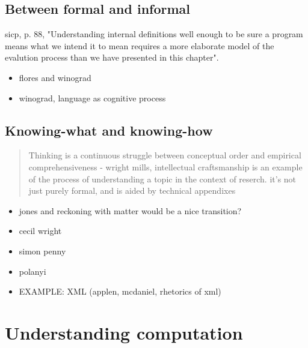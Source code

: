 \subsection{Between formal and informal} %




sicp,  p. 88, "Understanding internal definitions well enough to be sure a program means what we intend it to mean requires a more elaborate model of the evalution process than we have presented in this chapter".

\begin{itemize}
    \item flores and winograd
    \item winograd, language as cognitive process
\end{itemize}



\subsection{Knowing-what and knowing-how} %


\begin{quote}
    Thinking is a continuous struggle between conceptual order and empirical comprehensiveness - wright mills, intellectual craftsmanship is an example of the process of understanding a topic in the context of reserch. it's not just purely formal, and is aided by technical appendixes
\end{quote}

\begin{itemize}
    \item jones and reckoning with matter would be a nice transition?
    \item cecil wright
    \item simon penny
    \item polanyi
    \item EXAMPLE: XML (applen, mcdaniel, rhetorics of xml)
\end{itemize}


\section{Understanding computation}

